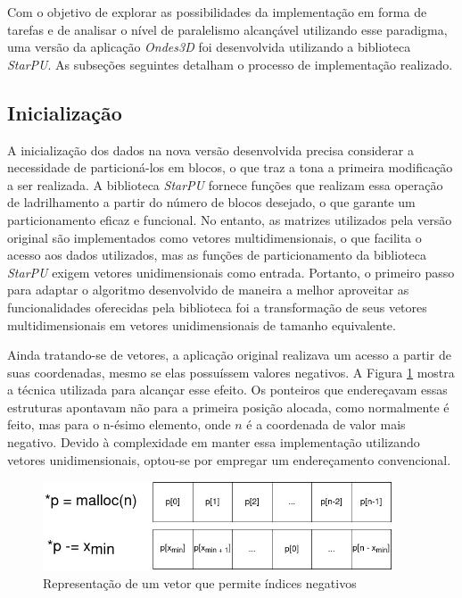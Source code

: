 \documentclass[cic,tc]{iiufrgs}
\begin{document}
Com o objetivo de explorar as possibilidades da implementação em forma de tarefas e de analisar o nível de paralelismo alcançável utilizando esse paradigma, uma versão da aplicação \textit{Ondes3D} foi
desenvolvida utilizando a biblioteca \textit{StarPU}. As subseções seguintes detalham o processo de implementação realizado.

\subsection{Inicialização}

A inicialização dos dados na nova versão desenvolvida precisa considerar a necessidade de particioná-los em blocos, o que traz a tona a primeira modificação a ser realizada. A biblioteca
\textit{StarPU} fornece funções que realizam essa operação de ladrilhamento a partir do número de blocos desejado, o que garante um particionamento eficaz e funcional. No entanto, as matrizes
utilizados pela versão original são implementados como vetores multidimensionais, o que facilita o acesso aos dados utilizados, mas as funções de particionamento da biblioteca \textit{StarPU} exigem
vetores unidimensionais como entrada. Portanto, o primeiro passo para adaptar o algoritmo desenvolvido de maneira a melhor aproveitar as funcionalidades oferecidas pela biblioteca foi a transformação 
de seus vetores multidimensionais em vetores unidimensionais de tamanho equivalente.

Ainda tratando-se de vetores, a aplicação original realizava um acesso a partir de suas coordenadas, mesmo se elas possuíssem valores negativos. A Figura \ref{fig:negative_index} mostra a
técnica utilizada para alcançar esse efeito. Os ponteiros que endereçavam essas estruturas apontavam não para a primeira posição alocada, como normalmente é feito, mas para o n-ésimo elemento,
onde $n$ é a coordenada de valor mais negativo. Devido à complexidade em manter essa implementação utilizando vetores unidimensionais, optou-se por empregar um endereçamento convencional.

\begin{figure}[!htb]
    \caption{Representação de um vetor que permite índices negativos}
    \begin{center}
      \includegraphics[width=28em]{negative_index}
    \end{center}
    \label{fig:negative_index}
\end{figure}
\end{document}
